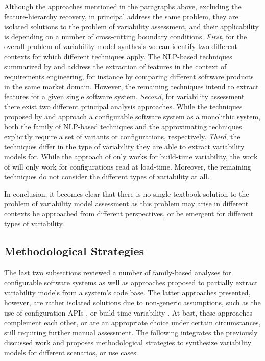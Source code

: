 Although the approaches mentioned in the paragraphs above, excluding the
feature-hierarchy recovery, in principal address the same problem, they are
isolated solutions to the problem of variability assessment, and their
applicability is depending on a number of cross-cutting boundary conditions.
\emph{First}, for the overall problem of variability model synthesis we can
identify two different contexts for which different techniques apply. The NLP-based
techniques summarized by \cite{alves_exploratory_2008} and \cite{bakar_feature_2015} address
the extraction of features in the context of requirements engineering, for instance by comparing different
software products in the same market domain. However, the remaining techniques
intend to extract features for a given single software system.
\emph{Second}, for variability assessment there exist two different principal
analysis approaches. While the techniques proposed by \cite{nadi_mining_2014,nadi_where_2015}
and \cite{rabkin_static_2011} approach a configurable software system as a monolithic system,
both the family of NLP-based techniques and the approximating techniques
\cite{lopez-herrejon_reverse_2012,lopez-herrejon_assessment_2015,linsbauer_feature_2014}
explicitly require a set of variants or configurations, respectively.
\emph{Third}, the techniques differ in the type of variability they are able to
extract variability models for. While the approach of
\cite{nadi_mining_2014,nadi_where_2015} only works for build-time variability, the work of
\cite{rabkin_static_2011} will only work for configurations read at load-time. Moreover, the remaining techniques do not consider the different types of
variability at all.

In conclusion, it becomes clear that there is no single textbook solution to
the problem of variability model assessment as this problem may arise in
different contexts be approached from different perspectives, or be emergent
for different types of variability.

\subsection{Methodological Strategies}
The last two subsections reviewed a number of family-based analyses for
configurable software systems as well as approaches proposed to partially
extract variability models from a system’s code base. The latter approaches
presented, however, are rather isolated solutions due to non-generic
assumptions, such as the use of configuration APIs \citep{rabkin_static_2011},
or build-time variability \citep{nadi_where_2015}. At best, these approaches
complement each other, or are an appropriate choice under certain
circumstances, still requiring further manual assessment. The following
integrates the previously discussed work and proposes methodological strategies
to synthesize variability models for different scenarios, or use cases.

